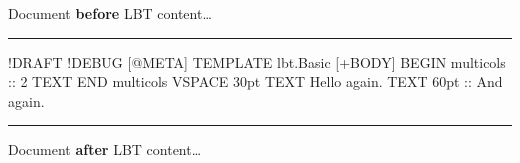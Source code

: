 \documentclass[a4paper,11pt]{article}
\begin{document}

  Document \textbf{before} LBT content\dots

  \noindent\rule{\textwidth}{0.5pt}

  \begin{lbt}
    !DRAFT
    !DEBUG
    [@META]
      TEMPLATE lbt.Basic
    [+BODY]
      BEGIN multicols :: 2
      TEXT \lipsum[1-5]
      END multicols
      VSPACE 30pt
      TEXT Hello again.
      TEXT 60pt :: And again.
  \end{lbt}

  \noindent\rule{\textwidth}{0.5pt}

  Document \textbf{after} LBT content\dots
\end{document}
